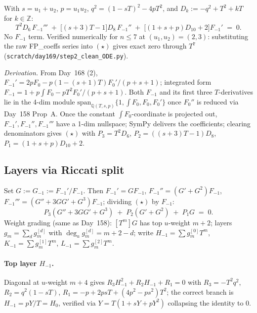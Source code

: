 \documentclass[11pt]{amsart}
\begin{document}
With $s = u_1 + u_2$, $p = u_1 u_2$, $q^2 = (1 - s T)^2 - 4 p T^2$, and
$D_k := -q^2 + T^2 + k T$ for $k \in \mathbb{Z}$:
\begin{equation}
\boxed{\;\;
T^2 D_6\, F_{-1}''' \;+\; \bigl[(s+3) T - 1\bigr] D_8\, F_{-1}'' \;+\; \bigl[(1 + s + p) D_{10} + 2\bigr] F_{-1}' \;=\; 0.
\;\;} \tag{$\star$}
\end{equation}
No $F_{-1}$ term. Verified numerically for $n \le 7$ at $(u_1, u_2) = (2, 3)$:
substituting the raw FP\_coeffs series into $(\star)$ gives exact zero
through $T^7$
(\texttt{scratch/day169/step2\_clean\_ODE.py}).

\emph{Derivation.} From Day~168 (2), $F_{-1}' = 2 p F_0 - p (1 - (s+1) T) F_0'/(p+s+1)$; integrated form $F_{-1} = 1 + p \int F_0 - p T^2 F_0'/(p+s+1)$. Both $F_{-1}$ and its first three $T$-derivatives lie in the 4-dim module $\mathrm{span}_{\mathbb{Q}(T, s, p)}\{1, \int F_0, F_0, F_0'\}$ once $F_0''$ is reduced via Day~158 Prop~A. Once the constant $\int F_0$-coordinate is projected out, $F_{-1}', F_{-1}'', F_{-1}'''$ have a 1-dim nullspace; SymPy delivers the coefficients; clearing denominators gives $(\star)$ with $P_3 = T^2 D_6$, $P_2 = ((s+3) T - 1) D_8$, $P_1 = (1 + s + p) D_{10} + 2$.

\subsection{Layers via Riccati split}

Set $G := G_{-1} := F_{-1}'/F_{-1}$. Then $F_{-1}' = G F_{-1}$, $F_{-1}'' = (G' + G^2) F_{-1}$, $F_{-1}''' = (G'' + 3 G G' + G^3) F_{-1}$; dividing $(\star)$ by $F_{-1}$:
\begin{equation}
P_3 (G'' + 3 G G' + G^3) \;+\; P_2 (G' + G^2) \;+\; P_1 G \;=\; 0. \tag{$\star\star$}
\end{equation}
Weight grading (same as Day~158): $[T^m] G$ has top $u$-weight $m + 2$; layers
$g_m = \sum_d g_m^{[d]}$ with $\deg_u g_m^{[d]} = m + 2 - d$; write
$H_{-1} = \sum g_m^{[0]} T^m$, $K_{-1} = \sum g_m^{[1]} T^m$,
$L_{-1} = \sum g_m^{[2]} T^m$.

\paragraph{Top layer $H_{-1}$.}
Diagonal at $u$-weight $m + 4$ gives $R_3 H_{-1}^2 + R_2 H_{-1} + R_1 = 0$
with $R_3 = -T^2 q^2$, $R_2 = q^2 (1 - s T)$,
$R_1 = -p + 2 p s T + (4 p^2 - p s^2) T^2$; the correct branch is
$H_{-1} = p Y / T = H_0$, verified via $Y = T(1 + s Y + p Y^2)$ collapsing
the identity to $0$.
\end{document}
